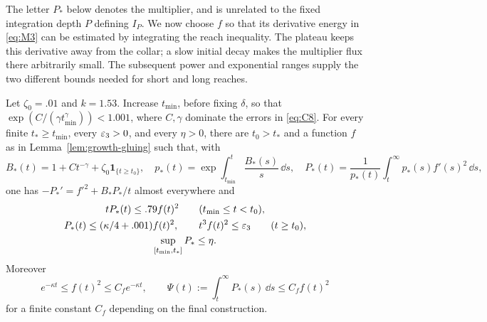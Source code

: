The letter $P_*$ below denotes the multiplier, and is unrelated to the
fixed integration depth $P$ defining $I_P$.
We now choose $f$ so that its derivative energy in \eqref{eq:M3} can be
estimated by integrating the reach inequality.  The plateau keeps this
derivative away from the collar; a slow initial decay makes the
multiplier flux there arbitrarily small.  The subsequent power and
exponential ranges supply the two different bounds needed for short
and long reaches.

\begin{lemma}
\label{lem:growth-multiplier}
Let $\zeta_0=.01$ and $k=1.53$.  Increase $t_{\min}$, before fixing
$\delta$, so that
$\exp(C/(\gamma t_{\min}^{\gamma}))<1.001$, where $C,\gamma$ dominate
the errors in \eqref{eq:C8}.  For every finite $t_*\ge t_{\min}$,
every $\varepsilon_3>0$, and every $\eta>0$, there are $t_0>t_*$ and a
function $f$ as in Lemma~\ref{lem:growth-gluing} such that, with
\[
 B_*(t)=1+Ct^{-\gamma}+\zeta_0\mathbf1_{\{t\ge t_0\}},\quad
 p_*(t)=\exp\int_{t_{\min}}^t\frac{B_*(s)}s\,\dd s,\quad
 P_*(t)=\frac1{p_*(t)}\int_t^\infty p_*(s)f'(s)^2\,\dd s,
\]
one has $-P_*'=f'^2+B_*P_*/t$ almost everywhere and
\begin{equation}\label{eq:M6}
 \begin{gathered}
 tP_*(t)\le .79f(t)^2\qquad(t_{\min}\le t<t_0),\\
 P_*(t)\le(\kappa/4+.001)f(t)^2,\qquad
 t^3f(t)^2\le\varepsilon_3\qquad(t\ge t_0),\\
 \sup_{[t_{\min},t_*]}P_*\le\eta.
 \end{gathered}
\end{equation}
Moreover
\[
 e^{-\kappa t}\le f(t)^2\le C_f e^{-\kappa t},\qquad
 \Psi(t):=\int_t^\infty P_*(s)\,\dd s\le C_f f(t)^2
\]
for a finite constant $C_f$ depending on the final construction.
\end{lemma}


